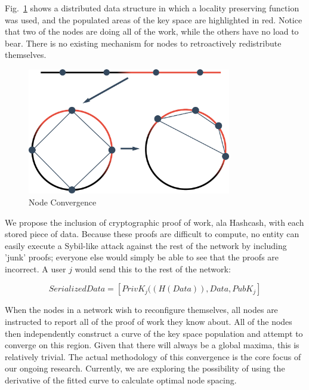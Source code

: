 \documentclass[10pt]{IEEEtran}
\begin{document}
\par Fig.~\ref{fig_kSpaceUneven} shows a distributed data structure in which a locality preserving function was used, and the populated areas of the key space are highlighted in red. Notice that two of the nodes are doing all of the work, while the others have no load to bear. There is no existing mechanism for nodes to retroactively redistribute themselves.

\begin{figure}[!t]
\centering
\includegraphics[width=3.5in]{unevenDistro}
\caption{Node Convergence}
\label{fig_kSpaceUneven}
\end{figure}

\par We propose the inclusion of cryptographic proof of work, ala Hashcash\cite{Back:2002vq}, with each stored piece of data. Because these proofs are difficult to compute, no entity can easily execute a Sybil-like attack against the rest of the network by including 'junk' proofs; everyone else would simply be able to see that the proofs are incorrect. A user $j$ would send this to the rest of the network:

\begin{equation} \label{eq:proof}
SerializedData = [PrivK_{j}((H(Data)), Data, PubK_{j}]
\end{equation}

\par When the nodes in a network wish to reconfigure themselves, all nodes are instructed to report all of the proof of work they know about. All of the nodes then independently construct a curve of the key space population and attempt to converge on this region. Given that there will always be a global maxima, this is relatively trivial. The actual methodology of this convergence is the core focus of our ongoing research. Currently, we are exploring the possibility of using the derivative of the fitted curve to calculate optimal node spacing.
\end{document}
